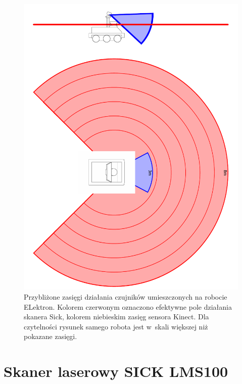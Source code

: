 \begin{figure}[htp!]
\centering
\includegraphics{../../Common/img/elektron/range}
\caption[Przybliżone zasięgi działania czujników umieszczonych na robocie
ELektron]{Przybliżone zasięgi działania czujników umieszczonych na robocie
ELektron. Kolorem czerwonym oznaczono efektywne pole działania skanera Sick,
kolorem niebieskim zasięg sensora Kinect. Dla czytelności rysunek samego robota
jest w~skali większej niż pokazane zasięgi.}
\label{fig:range}
\end{figure}



\section{Skaner laserowy SICK LMS100}

